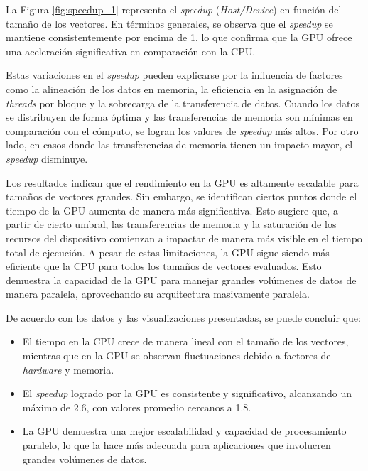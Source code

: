 \documentclass{article}
\begin{document}
			La Figura \ref{fig:speedup_1} representa el \textit{speedup} (\textit{Host/Device}) en función del tamaño de los vectores. En términos generales, se observa que el \textit{speedup} se mantiene consistentemente por encima de 1, lo que confirma que la GPU ofrece una aceleración significativa en comparación con la CPU.

			Estas variaciones en el \textit{speedup} pueden explicarse por la influencia de factores como la alineación de los datos en memoria, la eficiencia en la asignación de \textit{threads} por bloque y la sobrecarga de la transferencia de datos. Cuando los datos se distribuyen de forma óptima y las transferencias de memoria son mínimas en comparación con el cómputo, se logran los valores de \textit{speedup} más altos. Por otro lado, en casos donde las transferencias de memoria tienen un impacto mayor, el \textit{speedup} disminuye.

			Los resultados indican que el rendimiento en la GPU es altamente escalable para tamaños de vectores grandes. Sin embargo, se identifican ciertos puntos donde el tiempo de la GPU aumenta de manera más significativa. Esto sugiere que, a partir de cierto umbral, las transferencias de memoria y la saturación de los recursos del dispositivo comienzan a impactar de manera más visible en el tiempo total de ejecución. A pesar de estas limitaciones, la GPU sigue siendo más eficiente que la CPU para todos los tamaños de vectores evaluados. Esto demuestra la capacidad de la GPU para manejar grandes volúmenes de datos de manera paralela, aprovechando su arquitectura masivamente paralela.

			De acuerdo con los datos y las visualizaciones presentadas, se puede concluir que:

			\begin{itemize}

				\item El tiempo en la CPU crece de manera lineal con el tamaño de los vectores, mientras que en la GPU se observan fluctuaciones debido a factores de \textit{hardware} y memoria.

				\item El \textit{speedup} logrado por la GPU es consistente y significativo, alcanzando un máximo de 2.6, con valores promedio cercanos a 1.8.

				\item La GPU demuestra una mejor escalabilidad y capacidad de procesamiento paralelo, lo que la hace más adecuada para aplicaciones que involucren grandes volúmenes de datos.

			\end{itemize}
\end{document}
